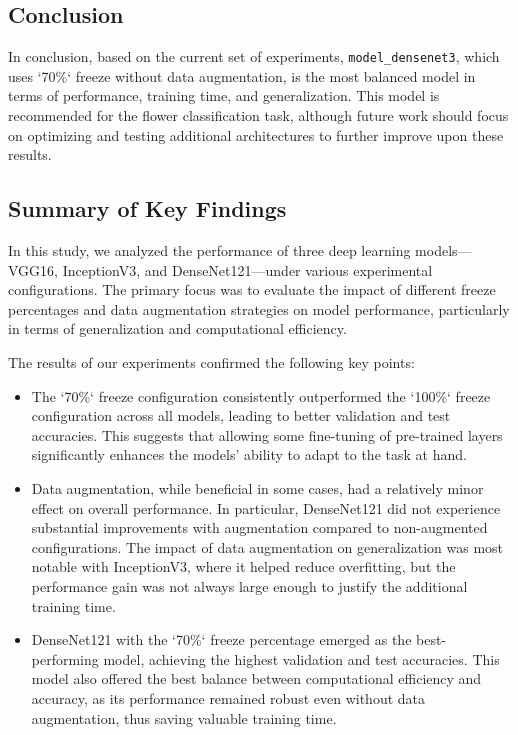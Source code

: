 \subsection{Conclusion}

In conclusion, based on the current set of experiments, \texttt{model\_densenet3}, which uses `70\%` freeze without data augmentation, is the most balanced model in terms of performance, training time, and generalization. This model is recommended for the flower classification task, although future work should focus on optimizing and testing additional architectures to further improve upon these results.

\subsection{Summary of Key Findings}

In this study, we analyzed the performance of three deep learning models—VGG16, InceptionV3, and DenseNet121—under various experimental configurations. The primary focus was to evaluate the impact of different freeze percentages and data augmentation strategies on model performance, particularly in terms of generalization and computational efficiency.

The results of our experiments confirmed the following key points:

\begin{itemize}
    \item The `70\%` freeze configuration consistently outperformed the `100\%` freeze configuration across all models, leading to better validation and test accuracies. This suggests that allowing some fine-tuning of pre-trained layers significantly enhances the models' ability to adapt to the task at hand.
    \item Data augmentation, while beneficial in some cases, had a relatively minor effect on overall performance. In particular, DenseNet121 did not experience substantial improvements with augmentation compared to non-augmented configurations. The impact of data augmentation on generalization was most notable with InceptionV3, where it helped reduce overfitting, but the performance gain was not always large enough to justify the additional training time.
    \item DenseNet121 with the `70\%` freeze percentage emerged as the best-performing model, achieving the highest validation and test accuracies. This model also offered the best balance between computational efficiency and accuracy, as its performance remained robust even without data augmentation, thus saving valuable training time.
\end{itemize}

